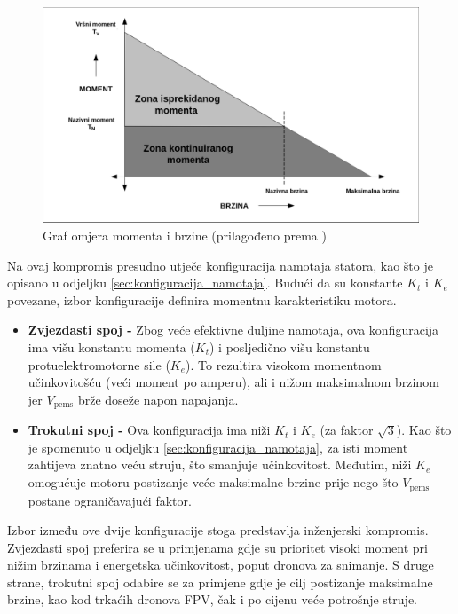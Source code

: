 \documentclass[diplomskirad]{fer}
\begin{document}
\begin{figure}[h!]
	\centering
	\includegraphics[width=\textwidth]{Figures/microchip_torque_speed.png}
	\caption{Graf omjera momenta i brzine (prilagođeno prema \cite{MicrochipAN885})}
	\label{fig:torque_speed}
\end{figure}

Na ovaj kompromis presudno utječe konfiguracija namotaja statora, kao što je
opisano u odjeljku \ref{sec:konfiguracija_namotaja}. Budući da su konstante
$K_t$ i $K_e$ povezane, izbor konfiguracije definira momentnu karakteristiku
motora.

\begin{itemize}
	\item \textbf{Zvjezdasti spoj -} Zbog veće efektivne duljine namotaja, ova konfiguracija ima višu konstantu momenta ($K_t$) i posljedično višu konstantu protuelektromotorne sile ($K_e$). To rezultira visokom momentnom učinkovitošću (veći moment po amperu), ali i nižom maksimalnom brzinom jer $V_{\text{pems}}$ brže doseže napon napajanja.

	\item \textbf{Trokutni spoj -} Ova konfiguracija ima niži $K_t$ i $K_e$ (za faktor $\sqrt{3}$). Kao što je spomenuto u odjeljku \ref{sec:konfiguracija_namotaja}, za isti moment zahtijeva znatno veću struju, što smanjuje učinkovitost. Međutim, niži $K_e$ omogućuje motoru postizanje veće maksimalne brzine prije nego što $V_{\text{pems}}$ postane ograničavajući faktor.
\end{itemize}

Izbor između ove dvije konfiguracije stoga predstavlja inženjerski kompromis.
Zvjezdasti spoj preferira se u primjenama gdje su prioritet visoki moment pri
nižim brzinama i energetska učinkovitost, poput dronova za snimanje. S druge
strane, trokutni spoj odabire se za primjene gdje je cilj postizanje maksimalne
brzine, kao kod trkaćih dronova FPV, čak i po cijenu veće potrošnje struje.
\end{document}
